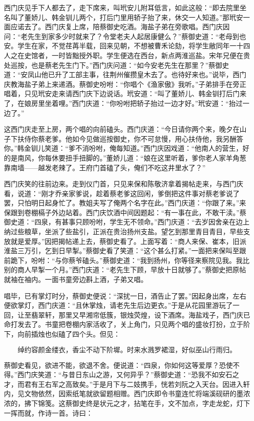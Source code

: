 西门庆见手下人都去了，走下席来，叫玳安儿附耳低言，如此这般：“即去院里坐名叫了董娇儿、韩金钏儿两个，打后门里用轿子抬了来，休交一人知道。”那玳安一面应诺去了。西门庆复上席，陪蔡御史吃酒。海盐子弟在旁歌唱。西门庆因问：“老先生到家多少时就来了？令堂老夫人起居康健么？”蔡御史道：“老母到也安。学生在家，不觉荏苒半载，回来见朝，不想被曹禾论劾，将学生敝同年一十四人之在史馆者，一时皆黜授外职。学生便选在西台，新点两淮巡盐。宋年兄便在贵处巡按，也是蔡老先生门下。”西门庆问道：“如今安老先生在那里？”蔡御史道：“安凤山他已升了工部主事，往荆州催攒皇木去了。也待好来也。”说毕，西门庆教海盐子弟上来递酒。蔡御史吩咐：“你唱个《渔家傲》我听。”子弟排手在旁正唱着，只见玳安走来请西门庆下边说话。玳安道：“叫了董娇儿、韩金钏打后门来了，在娘房里坐着哩。”西门庆道：“你吩咐把轿子抬过一边才好。”玳安道：“抬过一边了。”

这西门庆走至上房，两个唱的向前磕头。西门庆道：“今日请你两个来，晚夕在山子下扶侍你蔡老爹。他如今见做巡按御史，你不可怠慢，用心扶侍他，我另酬答你。”韩金钏儿笑道：“爹不消吩咐，俺每知道。”西门庆因戏道：“他南人的营生，好的是南风，你每休要扭手扭脚的。”董娇儿道：“娘在这里听着，爹你老人家羊角葱靠南墙——越发老辣了。王府门首磕了头，俺们不吃这井里水了？”

西门庆笑的往前边来。走到仪门首，只见来保和陈敬济拿着揭帖走来，与西门庆看，说道：“刚才乔亲家爹说，趁着蔡老爹这回闲，爹倒把这件事对蔡老爹说了罢，只怕明日起身忙了。教姐夫写了俺两个名字在此。”西门庆道：“你跟了来。”来保跟到卷棚槅子外边站着。西门庆饮酒中间因题起：“有一事在此，不敢干渎。”蔡御史道：“四泉，有甚事只顾吩咐，学生无不领命。”西门庆道：“去岁因舍亲在边上纳过些粮草，坐派了些盐引，正派在贵治扬州支盐。望乞到那里青目青目，早些支放就是爱厚。”因把揭帖递上去，蔡御史看了。上面写着：“商人来保、崔本，旧派淮盐三万引，乞到日早掣。”蔡御史看了笑道：“这个甚么打紧。”一面把来保叫至跟前跪下，吩咐：“与你蔡爷磕头。”蔡御史道：“我到扬州，你等径来察院见我。我比别的商人早掣一个月。”西门庆道：“老先生下顾，早放十日就够了。”蔡御史把原帖就袖在袖内。一面书童旁边斟上酒，子弟又唱。

唱毕，已有掌灯时分，蔡御史便说：“深扰一日，酒告止了罢。”因起身出席，左右便欲掌灯，西门庆道：“且休掌烛，请老先生后边更衣。”于是从花园里游玩了一回，让至翡翠轩，那里又早湘帘低簇，银烛荧煌，设下酒席。海盐戏子，西门庆已命打发去了。书童把卷棚内家活收了，关上角门，只见两个唱的盛妆打扮，立于阶下，向前插烛也似磕了四个头。但见：

\[
绰约容颜金缕衣，香尘不动下阶墀。
时来水溅罗裙湿，好似巫山行雨归。
\]

蔡御史看见，欲进不能，欲退不舍。便说道：“四泉，你如何这等爱厚？恐使不得。”西门庆笑道：“与昔日东山之游，又何异乎？”蔡御史道：“恐我不如安石之才，而君有王右军之高致矣。”于是月下与二妓携手，恍若刘阮之入天台。因进入轩内，见文物依然，因索纸笔就欲留题相赠。西门庆即令书童连忙将端溪砚研的墨浓浓的，拂下锦笺。这蔡御史终是状元之才，拈笔在手，文不加点，字走龙蛇，灯下一挥而就，作诗一首。诗曰：

